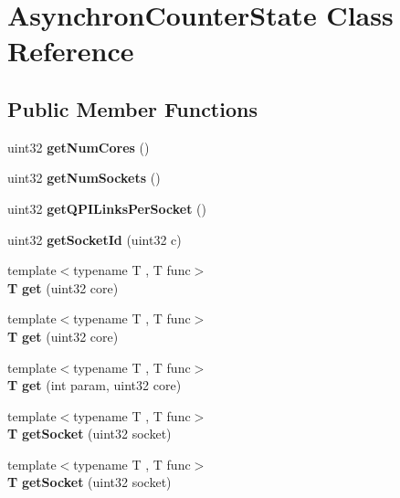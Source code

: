 \section{Asynchron\+Counter\+State Class Reference}
\label{classAsynchronCounterState}
\subsection*{Public Member Functions}
\begin{DoxyCompactItemize}
\item 
\mbox{\label{classAsynchronCounterState_ae50ebd3674b3ba52ff25f46b4eeb3956}} 
uint32 {\bfseries get\+Num\+Cores} ()
\item 
\mbox{\label{classAsynchronCounterState_aad5f8ed144ee05d32c4b82e8664ea294}} 
uint32 {\bfseries get\+Num\+Sockets} ()
\item 
\mbox{\label{classAsynchronCounterState_ab221a101212adceb2a248691eca8db1a}} 
uint32 {\bfseries get\+Q\+P\+I\+Links\+Per\+Socket} ()
\item 
\mbox{\label{classAsynchronCounterState_a9121ce142b39fd845f6c4eb101c214bf}} 
uint32 {\bfseries get\+Socket\+Id} (uint32 c)
\item 
\mbox{\label{classAsynchronCounterState_a8f8e4539b38c5f171faa235b196e6f6a}} 
{\footnotesize template$<$typename T , T  func$>$ }\\\textbf{ T} {\bfseries get} (uint32 core)
\item 
\mbox{\label{classAsynchronCounterState_a8f8e4539b38c5f171faa235b196e6f6a}} 
{\footnotesize template$<$typename T , T  func$>$ }\\\textbf{ T} {\bfseries get} (uint32 core)
\item 
\mbox{\label{classAsynchronCounterState_aa77c2086bbaa8214dc60176f6ba08e43}} 
{\footnotesize template$<$typename T , T  func$>$ }\\\textbf{ T} {\bfseries get} (int param, uint32 core)
\item 
\mbox{\label{classAsynchronCounterState_a272fad1f3bd704f873c9c3a29e95192b}} 
{\footnotesize template$<$typename T , T  func$>$ }\\\textbf{ T} {\bfseries get\+Socket} (uint32 socket)
\item 
\mbox{\label{classAsynchronCounterState_a272fad1f3bd704f873c9c3a29e95192b}} 
{\footnotesize template$<$typename T , T  func$>$ }\\\textbf{ T} {\bfseries get\+Socket} (uint32 socket)
\item 

\end{DoxyCompactItemize}
